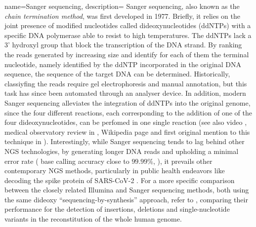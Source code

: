 {name=Sanger sequencing,
description={ 
Sanger sequencing, also known as the \emph{chain termination method}, was first developed in 1977. Briefly, it
relies on the joint presence of modified nucleotides called dideoxynucleotides (ddNTPs) with a 
specific DNA polymerase able to resist to high temperatures. The ddNTPs lack a 3' hydroxyl group that block the 
transcription of the DNA strand. By ranking the reads generated by increasing size and identify for each of them 
the terminal nucleotide, namely identified by the ddNTP incorporated in the original DNA sequence, 
the sequence of the target DNA can be determined. 
Historically, classiyfing the reads require gel electrophoresis and manual annotation, but 
this task has since been automated through an analyser device. In addition, modern Sanger sequencing 
alleviates the integration of ddNTPs into the original genome, since the four different reactions, each 
corresponding to the addition of one of the four dideoxynucleotides, can be perfomed in one single reaction
(see also video \autocite{quickbiochemistrybasics19}, medical observatory review in \autocite{phd17},
 Wikipedia page \autocite{Sanger23} and first original mention to this technique in \autocite{sanger_etal77}).
Interestingly, while Sanger sequencing tends to lag behind other NGS technologies, 
by generating longer DNA reads and upholding a minimal error rate (
 base calling accuracy close to $99.99\%$, \autocite{shendure_ji08} ), it prevails other contemporary NGS methods,
 particularly in public health endeavors like decoding the spike protein of SARS-CoV-2 \autocite{daniels_etal21}. For 
 a more specific comparison between the closely related Illumina and Sanger sequencing methods, both using the same
 dideoxy \enquote{sequencing-by-synthesis} approach, refer to \autocite{lam_etal12}, comparing their performance for 
 the detection of insertions, deletions and single-nucleotide variants in the reconstitution of the whole human genome.
}}

